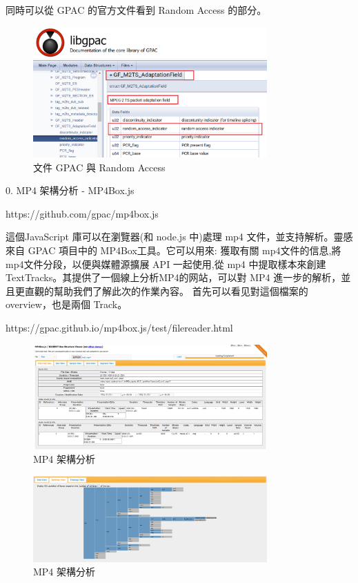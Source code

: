 \documentclass[10pt,UTF8]{ctexart}
\begin{document}
同時可以從 GPAC 的官方文件看到 Random Access 的部分。

\begin{figure}[H]
\centering 
\includegraphics[width=0.80\textwidth]{g7.png} 
\caption{文件 GPAC 與 Random Access }
\label{Test}
\end{figure}

0. MP4 架構分析 - MP4Box.js

https://github.com/gpac/mp4box.js

這個JavaScript 庫可以在瀏覽器(和 node.js 中)處理 mp4 ⽂件，並⽀持解析。靈感來⾃ GPAC 項⽬中的 MP4Box⼯具。它可以⽤來:
獲取有關 mp4⽂件的信息,將 mp4⽂件分段，以便與媒體源擴展 API ⼀起使⽤,從 mp4 中提取樣本來創建 TextTracks。其提供了⼀個線上分析MP4的⽹站，可以對 MP4 進⼀步的解析，並且更直觀的幫助我們了解此次的作業內容。 ⾸先可以看⻅對這個檔案的 overview，也是兩個 Track。

https://gpac.github.io/mp4box.js/test/filereader.html

\begin{figure}[H]
\centering 
\includegraphics[width=0.80\textwidth]{m1.png} 
\caption{MP4 架構分析 }
\label{Test}
\end{figure}

\begin{figure}[H]
\centering 
\includegraphics[width=0.80\textwidth]{m2.png} 
\caption{MP4 架構分析 }
\label{Test}
\end{figure}
\end{document}
